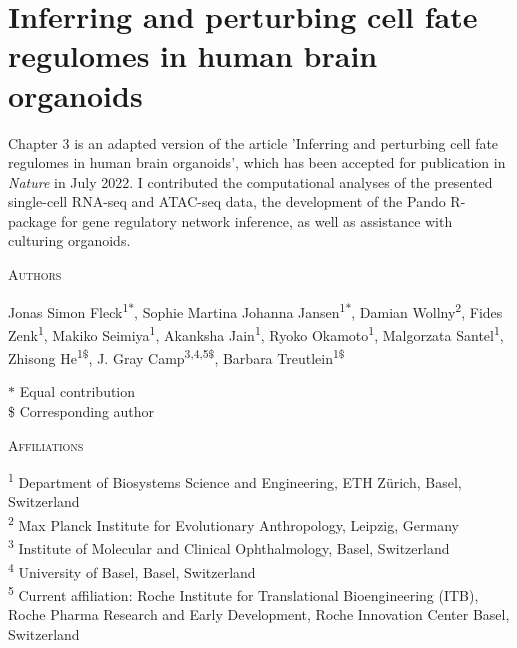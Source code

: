 \thispagestyle{plain}
\section{Inferring and perturbing cell fate regulomes in human brain organoids}


\vspace{0.5cm}

Chapter 3 is an adapted version of the article 'Inferring and perturbing cell fate regulomes in human brain organoids', which has been accepted for publication in \textit{Nature} in July 2022. I contributed the computational analyses of the presented single-cell RNA-seq and ATAC-seq data, the development of the Pando R-package for gene regulatory network inference, as well as assistance with culturing organoids.

\vspace{1cm}

\noindent
{\large\textsc{Authors}}

\noindent
Jonas Simon Fleck\textsuperscript{1$*$}, 
Sophie Martina Johanna Jansen\textsuperscript{1$*$}, 
Damian Wollny\textsuperscript{2}, 
Fides Zenk\textsuperscript{1}, 
Makiko Seimiya\textsuperscript{1}, 
Akanksha Jain\textsuperscript{1}, 
Ryoko Okamoto\textsuperscript{1}, 
Malgorzata Santel\textsuperscript{1}, 
Zhisong He\textsuperscript{1\$}, 
J. Gray Camp\textsuperscript{3,4,5\$}, 
Barbara Treutlein\textsuperscript{1\$}

\vspace{0.5cm}

\noindent
$\ast$ Equal contribution\\
\$ Corresponding author

\vspace{1cm}

\noindent
{\large\textsc{Affiliations}}

\noindent
\textsuperscript{1} Department of Biosystems Science and Engineering, ETH Zürich, Basel, Switzerland\\
\textsuperscript{2} Max Planck Institute for Evolutionary Anthropology, Leipzig, Germany\\
\textsuperscript{3} Institute of Molecular and Clinical Ophthalmology, Basel, Switzerland\\
\textsuperscript{4} University of Basel, Basel, Switzerland\\
\textsuperscript{5} Current affiliation: Roche Institute for Translational Bioengineering (ITB), Roche Pharma Research and Early Development, Roche Innovation Center Basel, Switzerland


